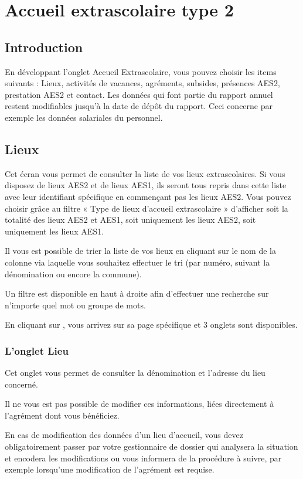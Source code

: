 \chapter{Accueil extrascolaire type 2}
\section*{Introduction}
En développant l’onglet Accueil Extrascolaire, vous pouvez choisir les items suivants : Lieux, activités de vacances, agréments, subsides, présences AES2, prestation AES2 et contact. 
Les données qui font partie du rapport annuel restent modifiables jusqu’à la date de dépôt du rapport. Ceci concerne par exemple les données salariales du personnel. 

\section{Lieux}
Cet écran vous permet de consulter la liste de vos lieux extrascolaires. 
Si vous disposez de lieux AES2 et de lieux AES1, ils seront tous repris dans cette liste avec leur identifiant spécifique en commençant pas les lieux AES2. Vous pouvez choisir grâce au filtre « Type de lieux d’accueil extrascolaire » d’afficher soit la totalité des lieux AES2 et AES1, soit uniquement les lieux AES2, soit uniquement les lieux AES1. 
\begin{info}
Il vous est possible de trier la liste de vos lieux en cliquant sur le nom de la colonne via laquelle vous souhaitez effectuer le tri (par numéro, suivant la dénomination ou encore la commune).

Un filtre est disponible en haut à droite afin d’effectuer une recherche sur n’importe quel mot ou groupe de mots.
\end{info}

En cliquant sur , vous arrivez sur sa page spécifique et 3 onglets sont disponibles.

\subsection{L'onglet Lieu}
Cet onglet vous permet de consulter la dénomination et l’adresse du lieu concerné. 

\begin{remarque}
Il ne vous est pas possible de modifier ces informations, liées directement à l’agrément dont vous bénéficiez.

En cas de modification des données d’un lieu d’accueil, vous devez obligatoirement passer par votre gestionnaire de dossier qui analysera la situation et encodera les modifications ou vous informera de la procédure à suivre, par exemple lorsqu’une modification de l’agrément est requise.
\end{remarque}

